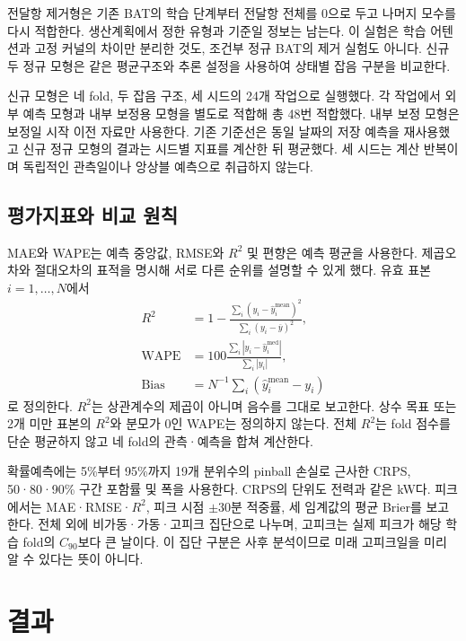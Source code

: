 \documentclass[letterpaper]{article}
\begin{document}
전달항 제거형은 기존 BAT의 학습 단계부터 전달항 전체를 0으로 두고 나머지 모수를 다시 적합한다. 생산계획에서 정한 유형과 기준일 정보는 남는다. 이 실험은 학습 어텐션과 고정 커널의 차이만 분리한 것도, 조건부 정규 BAT의 제거 실험도 아니다. 신규 두 정규 모형은 같은 평균구조와 추론 설정을 사용하여 상태별 잡음 구분을 비교한다.

신규 모형은 네 fold, 두 잡음 구조, 세 시드의 24개 작업으로 실행했다. 각 작업에서 외부 예측 모형과 내부 보정용 모형을 별도로 적합해 총 48번 적합했다. 내부 보정 모형은 보정일 시작 이전 자료만 사용한다. 기존 기준선은 동일 날짜의 저장 예측을 재사용했고 신규 정규 모형의 결과는 시드별 지표를 계산한 뒤 평균했다. 세 시드는 계산 반복이며 독립적인 관측일이나 앙상블 예측으로 취급하지 않는다.

\subsection{평가지표와 비교 원칙}
MAE와 WAPE는 예측 중앙값, RMSE와 $R^2$ 및 편향은 예측 평균을 사용한다. 제곱오차와 절대오차의 표적을 명시해 서로 다른 순위를 설명할 수 있게 했다. 유효 표본 $i=1,\ldots,N$에서
\begin{equation}
\begin{split}
R^2&=1-\frac{\sum_i(y_i-\widehat y_i^{\mathrm{mean}})^2}
                  {\sum_i(y_i-\overline y)^2},\\
\operatorname{WAPE}&=100\frac{\sum_i|y_i-\widehat y_i^{\mathrm{med}}|}{\sum_i|y_i|},\\
\operatorname{Bias}&=N^{-1}\sum_i(\widehat y_i^{\mathrm{mean}}-y_i)
\end{split}
\label{eq:metrics}
\end{equation}
로 정의한다. $R^2$는 상관계수의 제곱이 아니며 음수를 그대로 보고한다. 상수 목표 또는 2개 미만 표본의 $R^2$와 분모가 0인 WAPE는 정의하지 않는다. 전체 $R^2$는 fold 점수를 단순 평균하지 않고 네 fold의 관측·예측을 합쳐 계산한다.

확률예측에는 5\%부터 95\%까지 19개 분위수의 pinball 손실로 근사한 CRPS, 50·80·90\% 구간 포함률 및 폭을 사용한다. CRPS의 단위도 전력과 같은 kW다. 피크에서는 MAE·RMSE·$R^2$, 피크 시점 $\pm30$분 적중률, 세 임계값의 평균 Brier를 보고한다. 전체 외에 비가동·가동·고피크 집단으로 나누며, 고피크는 실제 피크가 해당 학습 fold의 $C_{90}$보다 큰 날이다. 이 집단 구분은 사후 분석이므로 미래 고피크일을 미리 알 수 있다는 뜻이 아니다.

\section{결과}
\end{document}
